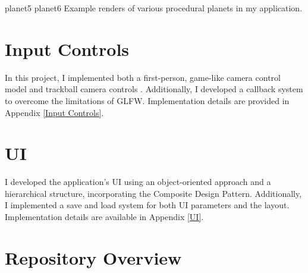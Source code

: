 {planet5}{}
{planet6}{}
{Example renders of various procedural planets in my application.}

\section{Input Controls}

In this project, I implemented both a first-person, game-like camera control model \cite{noauthor_first-person_2024} and trackball camera controls \cite{noauthor_object_nodate}. Additionally, I developed a callback system to overcome the limitations of GLFW. Implementation details are provided in Appendix \ref{Input Controls}.

\section{UI}

I developed the application's UI using an object-oriented approach and a hierarchical structure, incorporating the Composite Design Pattern. Additionally, I implemented a save and load system for both UI parameters and the layout. Implementation details are available in Appendix \ref{UI}.

\newpage
\section{Repository Overview}




